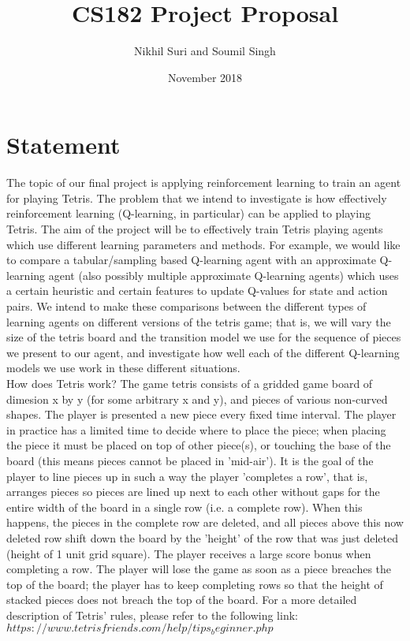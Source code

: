 \documentclass{article}
\title{CS182 Project Proposal}
\author{Nikhil Suri and Soumil Singh }
\date{November 2018}
\begin{document}
\maketitle

\section{Statement}
The topic of our final project is applying reinforcement learning to train an agent for playing Tetris. The problem that we intend to investigate is how effectively reinforcement learning (Q-learning, in particular) can be applied to playing Tetris. The aim of the project will be to effectively train Tetris playing agents which use different learning parameters and methods. For example, we would like to compare a tabular/sampling based Q-learning agent with an approximate Q-learning agent (also possibly multiple approximate Q-learning agents) which uses a certain heuristic and certain features to update Q-values for state and action pairs. We intend to make these comparisons between the different types of learning agents on different versions of the tetris game; that is, we will vary the size of the tetris board and the transition model we use for the sequence of pieces we present to our agent, and investigate how well each of the different Q-learning models we use work in these different situations. \\

How does Tetris work? The game tetris consists of a gridded game board of dimesion x by y (for some arbitrary x and y), and pieces of various non-curved shapes. The player is presented a new piece every fixed time interval. The player in practice has a limited time to decide where to place the piece; when placing the piece it must be placed on top of other piece(s), or touching the base of the board (this means pieces cannot be placed in 'mid-air'). It is the goal of the player to line pieces up in such a way the player 'completes a row', that is, arranges pieces so pieces are lined up next to each other without gaps for the entire width of the board in a single row (i.e. a complete row). When this happens, the pieces in the complete row are deleted, and all pieces above this now deleted row shift down the board by the 'height' of the row that was just deleted (height of 1 unit grid square). The player receives a large score bonus when completing a row. The player will lose the game as soon as a piece breaches the top of the board; the player has to keep completing rows so that the height of stacked pieces does not breach the top of the board. For a more detailed description of Tetris' rules, please refer to the following link: $https://www.tetrisfriends.com/help/tips_beginner.php$
\end{document}
